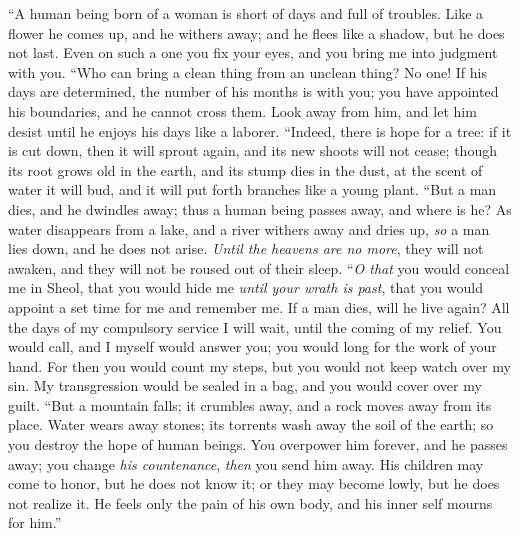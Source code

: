 \begin{biblechapter} %
 “A human being born of a woman 
is short of days and full of troubles.
\verse Like a flower he comes up, and he withers away; 
and he flees like a shadow, but he does not last.
\verse Even on such a one you fix your eyes, 
and you bring me into judgment with you.
\verse “Who can bring a clean thing from an unclean thing? 
No one!
\verse If his days are determined, the number of his months is with you; 
you have appointed his boundaries, and he cannot cross them.
\verse Look away from him, and let him desist 
until he enjoys his days like a laborer.
\verse “Indeed, there is hope for a tree: 
if it is cut down, then it will sprout again, 
and its new shoots will not cease;
\verse though its root grows old in the earth, 
and its stump dies in the dust,
\verse at the scent of water it will bud, 
and it will put forth branches like a young plant.
\verse “But a man dies, and he dwindles away; 
thus a human being passes away, and where is he?
\verse As water disappears from a lake, 
and a river withers away and dries up,
\verse \textit{so} a man lies down, and he does not arise. 
\textit{Until the heavens are no more}, they will not awaken, 
and they will not be roused out of their sleep.
\verse “\textit{O that} you would conceal me in Sheol, 
that you would hide me \textit{until your wrath is past}, 
that you would appoint a set time for me and remember me.
\verse If a man dies, will he live again? 
All the days of my compulsory service I will wait, 
until the coming of my relief.
\verse You would call, and I myself would answer you; 
you would long for the work of your hand.
\verse For then you would count my steps, 
but you would not keep watch over my sin.
\verse My transgression would be sealed in a bag, 
and you would cover over my guilt.
\verse “But a mountain falls; it crumbles away, 
and a rock moves away from its place.
\verse Water wears away stones; 
its torrents wash away the soil of the earth; 
so you destroy the hope of human beings.
\verse You overpower him forever, and he passes away; 
you change \textit{his countenance}, \textit{then} you send him away.
\verse His children may come to honor, but he does not know it; 
or they may become lowly, but he does not realize it.
\verse He feels only the pain of his own body, 
and his inner self mourns for him.”
\end{biblechapter}

